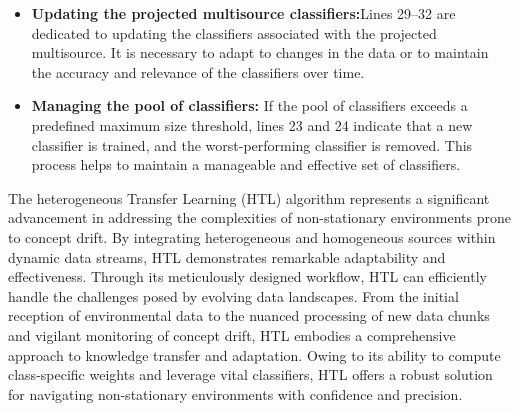 \begin{itemize}
	\item \textbf{Updating the projected multisource classifiers:}Lines 29–32 are dedicated to updating the classifiers associated with the projected multisource. It is necessary to adapt to changes in the data or to maintain the accuracy and relevance of the classifiers over time.
	\item \textbf{Managing the pool of classifiers:} If the pool of classifiers exceeds a predefined maximum size threshold, lines 23 and 24 indicate that a new classifier is trained, and the worst-performing classifier is removed. This process helps to maintain a manageable and effective set of classifiers.
\end{itemize}
The heterogeneous Transfer Learning (HTL) algorithm represents a significant advancement in addressing the complexities of non-stationary environments prone to concept drift. By integrating heterogeneous and homogeneous sources within dynamic data streams, HTL demonstrates remarkable adaptability and effectiveness. Through its meticulously designed workflow, HTL can efficiently handle the challenges posed by evolving data landscapes. From the initial reception of environmental data to the nuanced processing of new data chunks and vigilant monitoring of concept drift, HTL embodies a comprehensive approach to knowledge transfer and adaptation. Owing to its ability to compute class-specific weights and leverage vital classifiers, HTL offers a robust solution for navigating non-stationary environments with confidence and precision.


